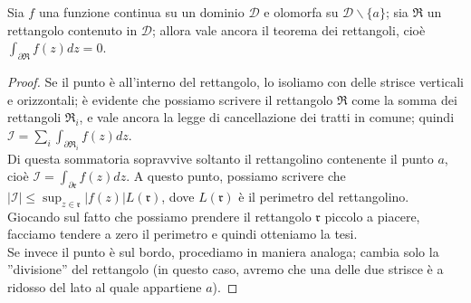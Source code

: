 \begin{teorema}
Sia $f$ una funzione continua su un dominio $\mathcal{D}$ e olomorfa su $\mathcal{D} \backslash \{a\}$; sia $\mathfrak{R}$ un rettangolo contenuto in $\mathcal{D}$; allora vale ancora il teorema dei rettangoli, cioè $\int_{\partial \mathfrak{R}} f(z)dz=0$.
\end{teorema}
\begin{proof}
Se il punto è all'interno del rettangolo, lo isoliamo con delle strisce verticali e orizzontali; è evidente che possiamo scrivere il rettangolo $\mathfrak{R}$ come la somma dei rettangoli $\mathfrak{R}_i$, e vale ancora la legge di cancellazione dei tratti in comune; quindi $\mathcal{I}=\sum_i \int_{\partial \mathfrak{R}_i} f(z)dz$. \\ Di questa sommatoria sopravvive soltanto il rettangolino contenente il punto $a$, cioè $\mathcal{I}=\int_{\partial \mathfrak{r}} f(z)dz$. A questo punto, possiamo scrivere che $|\mathcal{I}| \leq \sup_{z \in \mathfrak{r}} |f(z)| L(\mathfrak{r})$, dove $L(\mathfrak{r})$ è il perimetro del rettangolino. \\ Giocando sul fatto che possiamo prendere il rettangolo $\mathfrak{r}$ piccolo a piacere, facciamo tendere a zero il perimetro e quindi otteniamo la tesi.\\Se invece il punto è sul bordo, procediamo in maniera analoga; cambia solo la ''divisione'' del rettangolo (in questo caso, avremo che una delle due strisce è a ridosso del lato al quale appartiene $a$).
\end{proof}